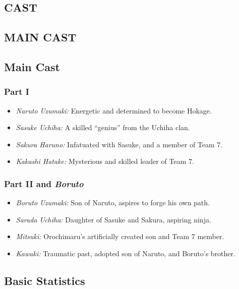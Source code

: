 \documentclass[
  letterpaper,
  DIV=11,
  numbers=noendperiod]{scrartcl}
\providecommand{\tightlist}{%
  \setlength{\itemsep}{0pt}\setlength{\parskip}{0pt}}\usepackage{longtable,booktabs,array}
\begin{document}
\subsection{CAST}

\subsection{MAIN CAST}

\subsection{Main Cast}

\hypertarget{part-i}{%
\subsubsection{Part I}\label{part-i}}

\begin{itemize}
\tightlist
\item
  \emph{Naruto Uzumaki:} Energetic and determined to become Hokage.
\item
  \emph{Sasuke Uchiha:} A skilled ``genius'' from the Uchiha clan.
\item
  \emph{Sakura Haruno:} Infatuated with Sasuke, and a member of Team 7.
\item
  \emph{Kakashi Hatake:} Mysterious and skilled leader of Team 7.
\end{itemize}

\hypertarget{part-ii-and-boruto}{%
\subsubsection{\texorpdfstring{Part II and
\emph{Boruto}}{Part II and Boruto}}\label{part-ii-and-boruto}}

\begin{itemize}
\tightlist
\item
  \emph{Boruto Uzumaki:} Son of Naruto, aspires to forge his own path.
\item
  \emph{Sarada Uchiha:} Daughter of Sasuke and Sakura, aspiring ninja.
\item
  \emph{Mitsuki:} Orochimaru's artificially created son and Team 7
  member.
\item
  \emph{Kawaki:} Traumatic past, adopted son of Naruto, and Boruto's
  brother.
\end{itemize}

\subsection{Basic Statistics}
\end{document}
